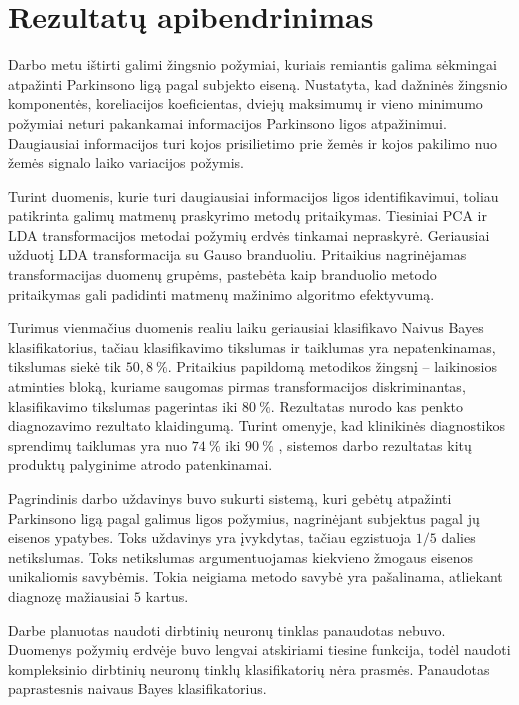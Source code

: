\documentclass[]{vgtuef}
\begin{document}
\section{Rezultatų apibendrinimas}


Darbo metu ištirti galimi žingsnio požymiai, kuriais remiantis galima sėkmingai atpažinti Parkinsono ligą pagal subjekto eiseną. Nustatyta, kad dažninės žingsnio komponentės, koreliacijos koeficientas, dviejų maksimumų ir vieno minimumo požymiai neturi pakankamai informacijos Parkinsono ligos atpažinimui. Daugiausiai informacijos turi kojos prisilietimo prie žemės ir kojos pakilimo nuo žemės signalo laiko variacijos požymis.

Turint duomenis, kurie turi daugiausiai informacijos ligos identifikavimui, toliau patikrinta galimų matmenų praskyrimo metodų pritaikymas. Tiesiniai PCA ir LDA transformacijos metodai požymių erdvės tinkamai nepraskyrė. Geriausiai užduotį LDA transformacija su Gauso branduoliu. Pritaikius nagrinėjamas transformacijas duomenų grupėms, pastebėta kaip branduolio metodo pritaikymas gali padidinti matmenų mažinimo algoritmo efektyvumą.


Turimus vienmačius duomenis realiu laiku geriausiai klasifikavo Naivus Bayes klasifikatorius, tačiau klasifikavimo tikslumas ir taiklumas yra nepatenkinamas, tikslumas siekė tik $50,8~\%$. Pritaikius papildomą metodikos žingsnį -- laikinosios atminties bloką, kuriame saugomas pirmas transformacijos diskriminantas, klasifikavimo tikslumas pagerintas iki $80~\%$. Rezultatas nurodo kas penkto diagnozavimo rezultato klaidingumą. Turint omenyje, kad klinikinės diagnostikos sprendimų taiklumas yra nuo $74~\%$ iki $90~\%$ \cite{vgtu}, sistemos darbo rezultatas kitų produktų palyginime atrodo patenkinamai.


Pagrindinis darbo uždavinys buvo sukurti sistemą, kuri gebėtų atpažinti Parkinsono ligą pagal galimus ligos požymius, nagrinėjant subjektus pagal jų eisenos ypatybes. Toks uždavinys yra įvykdytas, tačiau egzistuoja $1/5$ dalies netikslumas. Toks netikslumas argumentuojamas kiekvieno žmogaus eisenos unikaliomis savybėmis. Tokia neigiama metodo savybė yra pašalinama, atliekant diagnozę mažiausiai $5$ kartus.

Darbe planuotas naudoti dirbtinių neuronų tinklas panaudotas nebuvo. Duomenys požymių erdvėje buvo lengvai atskiriami tiesine funkcija, todėl naudoti kompleksinio dirbtinių neuronų tinklų klasifikatorių nėra prasmės. Panaudotas paprastesnis naivaus Bayes klasifikatorius.
\end{document}
